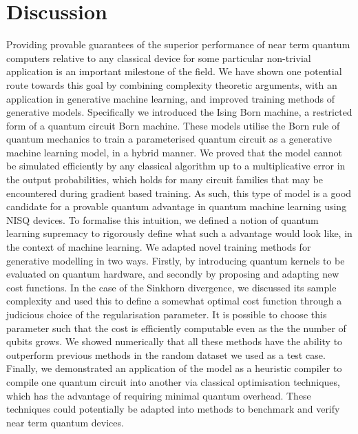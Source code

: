 \section*{Discussion}\label{sec:discussion}
Providing provable guarantees of the superior performance of near term quantum computers relative to any classical device for some particular non-trivial application is an important milestone of the field. We have shown one potential route towards this goal by combining complexity theoretic arguments\cite{bremner_classical_2011, aaronson_computational_2013, boixo_characterizing_2018}, with an application in generative machine learning\cite{gao_efficient_2017, benedetti_generative_2019, liu_differentiable_2018, du_expressive_2018}, and improved training methods of generative models. Specifically we introduced the Ising Born machine, a restricted form of a quantum circuit Born machine. These models utilise the Born rule of quantum mechanics to train a parameterised quantum circuit as a generative machine learning model, in a hybrid manner.
We proved that the model cannot be simulated efficiently by any classical algorithm up to a multiplicative error in the output probabilities, which holds for many circuit families that may be encountered during gradient based training. As such, this type of model is a good candidate for a provable quantum advantage in quantum machine learning using NISQ devices. To formalise this intuition, we defined a notion of quantum learning supremacy to rigorously define what such a advantage would look like, in the context of machine learning.
We adapted novel training methods for generative modelling in two ways. Firstly, by introducing quantum kernels to be evaluated on quantum hardware, and secondly by proposing and adapting new cost functions. In the case of the Sinkhorn divergence, we discussed its sample complexity and used this to define a somewhat optimal cost function through a judicious choice of the regularisation parameter. It is possible to choose this parameter such that the cost is efficiently computable even as the the number of qubits grows. We showed numerically that all these methods have the ability to outperform previous methods in the random dataset we used as a test case. Finally, we demonstrated an application of the model as a heuristic compiler to compile one quantum circuit into another via classical optimisation techniques, which has the advantage of requiring minimal quantum overhead. These techniques could potentially be adapted into methods to benchmark and verify near term quantum devices.

